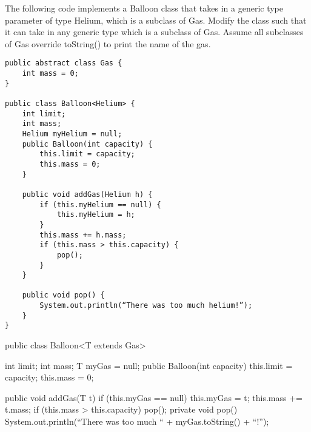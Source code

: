 \begin{blocksection}
\question The following code implements a Balloon class that takes in a generic type parameter of type Helium, which is a subclass of Gas. Modify the class such that it can take in any generic type which is a subclass of Gas. Assume all subclasses of Gas override toString() to print the name of the gas. 

\begin{lstlisting}
public abstract class Gas {
    int mass = 0; 
}

public class Balloon<Helium> {
    int limit;
    int mass;
    Helium myHelium = null;
    public Balloon(int capacity) {
        this.limit = capacity;
        this.mass = 0;
    }
        
    public void addGas(Helium h) {
        if (this.myHelium == null) {
	        this.myHelium = h;
        }
        this.mass += h.mass;
        if (this.mass > this.capacity) {
	        pop();
        }
    }

    public void pop() {
        System.out.println(“There was too much helium!”);
    }
}
\end{lstlisting}

\begin{solution}[1.5in]
public class Balloon<T extends Gas> {
    int limit;
    int mass;
    T myGas = null;
    public Balloon(int capacity) {
        this.limit = capacity;
        this.mass = 0;
    }
    
    public void addGas(T t) {
        if (this.myGas == null) {
	        this.myGas = t;
        }
        this.mass += t.mass;
        if (this.mass > this.capacity) {
	        pop();
        }
    }
    private void pop() {
        System.out.println(“There was too much “ + myGas.toString() + “!”);
    }
}

\end{solution}


\end{blocksection}